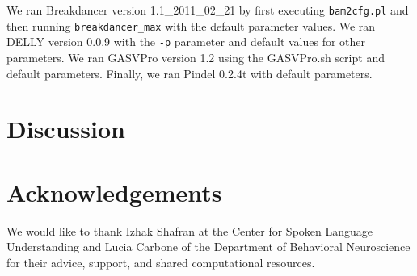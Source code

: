 \documentclass[11pt]{article}
\begin{document}
We ran Breakdancer version 1.1\_2011\_02\_21 by first executing \verb|bam2cfg.pl| and then running \verb|breakdancer_max| with the default parameter values. We ran DELLY version 0.0.9 with the \verb|-p| parameter and default values for other parameters. We ran GASVPro version 1.2 using the GASVPro.sh script and default parameters. Finally, we ran Pindel 0.2.4t with default parameters.

\section{Discussion}\label{conclusions}



\section{Acknowledgements}

We would like to thank Izhak Shafran at the Center for Spoken Language Understanding and Lucia Carbone of the Department of Behavioral Neuroscience for their advice, support, and shared computational resources.

\newpage

\printbibliography
\end{document}
